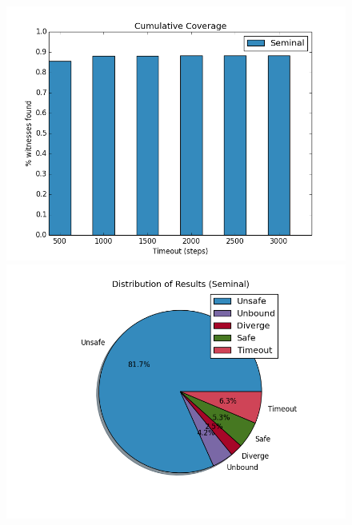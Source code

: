 \begin{figure}[t]
  \centering

  \includegraphics[width=\linewidth]{coverage.png}
  \includegraphics[width=\linewidth]{distrib_seminal.png}



\end{figure}
